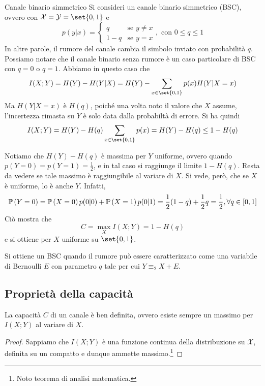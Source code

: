 \begin{example}{Canale binario simmetrico}
  Si consideri un canale binario simmetrico (BSC), ovvero con \(\mathcal{X} = \mathcal{Y} = \set{0,1}\) e 
  \[p(y|x) = \begin{cases}
    q & \text{se } y\neq x \\
    1-q & \text{se } y = x
  \end{cases}, \text{ con } 0\leq q \leq 1\]
  In altre parole, il rumore del canale cambia il simbolo inviato con probabilità \(q\).
  Possiamo notare che il canale binario senza rumore è un caso particolare di BSC con \(q=0\) o \(q=1\).
  Abbiamo in questo caso che
  \[I(X;Y) = H(Y) - H(Y|X) = H(Y) - \sum_{x\in\set{0,1}} p(x) H(Y|X=x)\]
  Ma \(H(Y|X=x)\) è \(H(q)\), poiché una volta noto il valore che \(X\) assume, l'incertezza rimasta su \(Y\) è solo data dalla probabiltà di errore. Si ha quindi
  \[ I(X;Y)=H(Y)-H(q)\sum_{x\in\set{0,1}} p(x) = H(Y) - H(q)\leq 1- H(q)\]

  Notiamo che \(H(Y)-H(q)\) è massima per $Y$ uniforme, ovvero quando \(p(Y=0) = p(Y=1) = \frac{1}{2}\), e in tal caso si raggiunge il limite \(1-H(q)\).
  Resta da vedere se tale massimo è raggiungibile al variare di \(X\).
  Si vede, però, che se \(X\) è uniforme, lo è anche \(Y\). Infatti,
  \[\Prob[Y=0] = \Prob[X=0]p(0|0) + \Prob[X=1]p(0|1) = \frac{1}{2}(1-q) +\frac{1}{2}q = \frac{1}{2}, \forall q \in [0,1]\]
  Ciò mostra che
  \[C = \max_{X} I(X;Y) = 1 - H(q)\]
  e si ottiene per \(X\) uniforme su \(\set{0,1}\).

  \begin{observation}{}
    Si ottiene un BSC quando il rumore può essere caratterizzato come una variabile di Bernoulli \(E\) con parametro \(q\) tale per cui \(Y \equiv_{2} X + E\).
  \end{observation}
\end{example}

\subsection{Proprietà della capacità}

\begin{proposition}{}
  La capacità \(C\) di un canale è ben definita, ovvero esiste sempre un massimo per \(I(X;Y)\) al variare di \(X\).
\end{proposition}

\begin{proof}
  Sappiamo che \(I(X;Y)\) è una funzione continua della distribuzione su \(\mathcal{X}\), definita su un compatto e dunque ammette massimo.\footnote{Noto teorema di analisi matematica.}
\end{proof}

